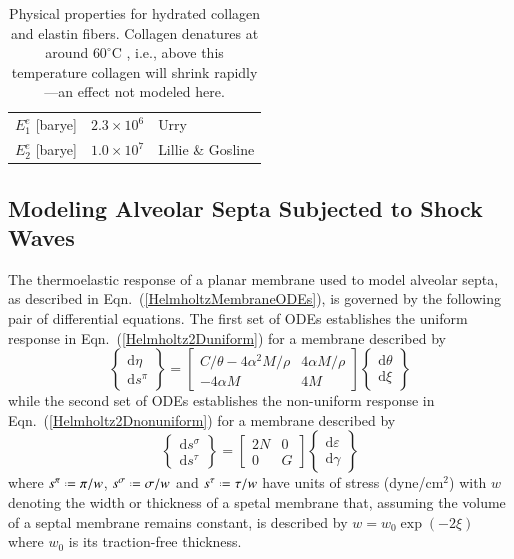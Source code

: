 \begin{table}
\begin{tabular}{|l|l|l|}
        $E^e_1$ \hfill [barye] & $2.3 \times 10^6$ & Urry \cite[Fig.~18]{Urry89} \\ 
        $E^e_2$ \hfill [barye] & $1.0 \times 10^7$ & 
        Lillie \& Gosline \cite[Fig.~5]{LillieGosline07} \\ \hline
    \end{tabular}
    \caption{Physical properties for hydrated collagen and elastin fibers.  Collagen denatures at around $60^\circ$C \cite{HoermannSchlebusch71}, i.e., above this temperature collagen will shrink rapidly---an effect not modeled here.}
    \label{tableCollagenElastin}
\end{table}

\subsection{Modeling Alveolar Septa Subjected to Shock Waves}
\label{secConjugatePairs}

The thermo\-elastic response of a planar membrane used to model alveolar septa, as described in Eqn.~(\ref{HelmholtzMembraneODEs}), is governed by the following pair of differential equations.  The first set of ODEs establishes the uniform response in Eqn.~(\ref{Helmholtz2Duniform}) for a membrane described by
\begin{displaymath}
    \left\{ \begin{matrix}
    \mathrm{d} \eta \\ \mathrm{d} s^{\pi}
    \end{matrix} \right\} = \begin{bmatrix}
    C / \theta - 4 \alpha^2 M / \rho & 
    4 \alpha M / \rho \\
    -4 \alpha M & 4 M
    \end{bmatrix} \left\{ \begin{matrix}
    \mathrm{d} \theta \\ \mathrm{d} \xi
    \end{matrix} \right\} 
\end{displaymath}
while the second set of ODEs establishes the non-uniform response in Eqn.~(\ref{Helmholtz2Dnonuniform}) for a membrane described by
\begin{displaymath}
    \left\{ \begin{matrix}
    \mathrm{d} s^{\sigma} \\ \mathrm{d} s^{\tau}
    \end{matrix} \right\} = \begin{bmatrix}
    2 N & 0 \\
    0 & G
    \end{bmatrix} \left\{ \begin{matrix}
    \mathrm{d} \varepsilon \\ \mathrm{d} \gamma
    \end{matrix} \right\}
\end{displaymath}
where $s^{\pi} \defeq \pi / w$, $s^{\sigma} \defeq \sigma / w$ and $s^{\tau} \defeq \tau / w$ have units of stress (dyne/$\text{cm}^2$) with $w$ denoting the width or thickness of a spetal membrane that, assuming the volume of a septal membrane remains constant, is described by $w = w_0 \exp ( -2 \xi )$ where $w_0$ is its traction-free thickness.

